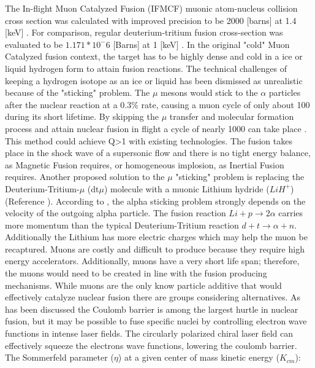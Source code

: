 \documentclass[English]{article}
\begin{document}
The In-flight Muon Catalyzed Fusion (IFMCF) muonic atom-nucleus collision cross section was calculated with improved precision to be 2000 [barns] at 1.4 [keV] \cite{MuCatFut}. For comparison, regular deuterium-tritium fusion cross-section was evaluated to be $1.171*10^-6$ [Barns] at 1 [keV] \cite{FuCross}. In the original "cold" Muon Catalyzed fusion context, the target has to be highly dense and cold in a ice or liquid hydrogen form to attain fusion reactions. The technical challenges of keeping a hydrogen isotope as an ice or liquid has been dismissed as unrealistic because of the "sticking" problem. The $\mu$ mesons would stick to the $\alpha$ particles after the nuclear reaction at a 0.3\% rate, causing a muon cycle of only about 100 during its short lifetime. By skipping the $\mu$ transfer and molecular formation process and attain nuclear fusion in flight a cycle of nearly 1000 can take place \cite{MuCatFut}. This method could achieve Q>1 with existing technologies. The fusion takes place in the shock wave of a supersonic flow and there is no tight energy balance, as Magnetic Fusion requires, or homogeneous implosion, as Inertial Fusion requires.
\newline
Another proposed solution to the $\mu$ "sticking" problem is replacing the Deuterium-Tritium-$\mu$ (dt$\mu$) molecule with a muonic Lithium hydride ($LiH^+$) (Reference \cite{wu2022investigating}). According to \cite{PhysRev.106.330}, the alpha sticking problem strongly depends on the velocity of the outgoing alpha particle. The fusion reaction $Li+p\rightarrow 2\alpha$ carries more momentum than the typical Deuterium-Tritium reaction $d+t\rightarrow\alpha+n$. Additionally the Lithium has more electric charges which may help the muon be recaptured. 
\newline
Muons are costly and difficult to produce because they require high energy accelerators. Additionally, muons have a very short life span; therefore, the muons would need to be created in line with the fusion producing mechanisms. 
\newline 
While muons are the only know particle additive that would effectively catalyze nuclear fusion there are groups considering alternatives. As has been discussed the Coulomb barrier is among the largest hurtle in nuclear fusion, but it may be possible to fuse specific nuclei by controlling electron wave functions in intense laser fields. The circularly polarized chiral laser field can effectively squeeze the electrons wave functions, lowering the coulomb barrier. The Sommerfeld parameter ($\eta$) at a given center of mass kinetic energy ($K_{cm}$):
\end{document}
